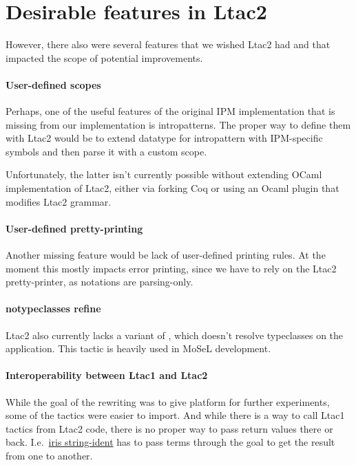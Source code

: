 \section{Desirable features in Ltac2}

However, there also were several features that we wished Ltac2 had and that impacted the scope of potential improvements.

\paragraph{User-defined scopes}

Perhaps, one of the useful features of the original IPM implementation that is missing from our implementation is intropatterns.
The proper way to define them with Ltac2 would be to extend datatype for intropattern with IPM-specific symbols and then parse it with a custom scope.

Unfortunately, the latter isn't currently possible without extending OCaml implementation of Ltac2, either via forking Coq or using an Ocaml plugin that modifies Ltac2 grammar.

\paragraph{User-defined pretty-printing}
Another missing feature would be lack of user-defined printing rules.
At the moment this mostly impacts error printing, since we have to rely on the Ltac2 pretty-printer, as notations are parsing-only.

\paragraph{notypeclasses refine}

Ltac2 also currently lacks a variant of , which doesn't resolve typeclasses on the application.
This tactic is heavily used in MoSeL development.

\paragraph{Interoperability between Ltac1 and Ltac2}

While the goal of the rewriting was to give platform for further experiments, some of the tactics were easier to import.
And while there is a way to call Ltac1 tactics from Ltac2 code, there is no proper way to pass return values there or back.
I.e.\ \href{https://gitlab.mpi-sws.org/iris/string-ident/}{iris string-ident} has to pass terms through the goal to get the result from one to another.

